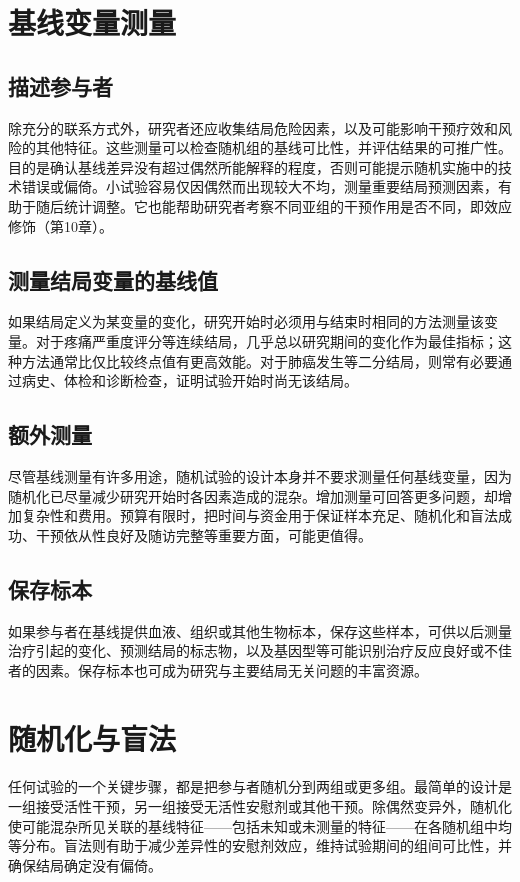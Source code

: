 \section{基线变量测量}
\subsection{描述参与者}
除充分的联系方式外，研究者还应收集结局危险因素，以及可能影响干预疗效和风险的其他特征。这些测量可以检查随机组的基线可比性，并评估结果的可推广性。目的是确认基线差异没有超过偶然所能解释的程度，否则可能提示随机实施中的技术错误或偏倚。小试验容易仅因偶然而出现较大不均，测量重要结局预测因素，有助于随后统计调整。它也能帮助研究者考察不同亚组的干预作用是否不同，即效应修饰（第10章）。

\subsection{测量结局变量的基线值}
如果结局定义为某变量的变化，研究开始时必须用与结束时相同的方法测量该变量。对于疼痛严重度评分等连续结局，几乎总以研究期间的变化作为最佳指标；这种方法通常比仅比较终点值有更高效能。对于肺癌发生等二分结局，则常有必要通过病史、体检和诊断检查，证明试验开始时尚无该结局。

\subsection{额外测量}
尽管基线测量有许多用途，随机试验的设计本身并不要求测量任何基线变量，因为随机化已尽量减少研究开始时各因素造成的混杂。增加测量可回答更多问题，却增加复杂性和费用。预算有限时，把时间与资金用于保证样本充足、随机化和盲法成功、干预依从性良好及随访完整等重要方面，可能更值得。

\subsection{保存标本}
如果参与者在基线提供血液、组织或其他生物标本，保存这些样本，可供以后测量治疗引起的变化、预测结局的标志物，以及基因型等可能识别治疗反应良好或不佳者的因素。保存标本也可成为研究与主要结局无关问题的丰富资源。

\section{随机化与盲法}
任何试验的一个关键步骤，都是把参与者随机分到两组或更多组。最简单的设计是一组接受活性干预，另一组接受无活性安慰剂或其他干预。除偶然变异外，随机化使可能混杂所见关联的基线特征——包括未知或未测量的特征——在各随机组中均等分布。盲法则有助于减少差异性的安慰剂效应，维持试验期间的组间可比性，并确保结局确定没有偏倚。

